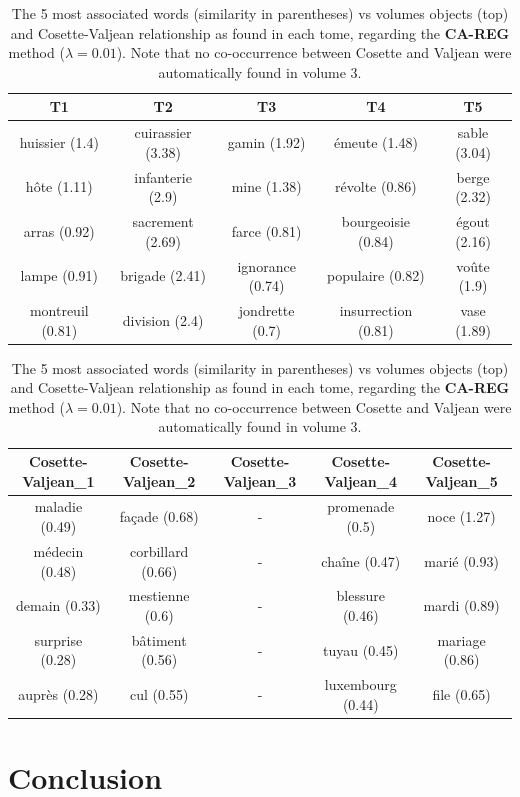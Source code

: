 \documentclass[
twocolumn,
]{ceurart}
\begin{document}
\begin{table}[!bh]
	\centering
	\begin{tabular}{|c|c|c|c|c|}
		\hline
		T1 & T2 & T3 & T4 & T5 \\ \hline
		huissier (1.4) & cuirassier (3.38) & gamin (1.92) & émeute (1.48) & sable (3.04) \\ \hline
		hôte (1.11) & infanterie (2.9) & mine (1.38) & révolte (0.86) & berge (2.32) \\ \hline
		arras (0.92) & sacrement (2.69) & farce (0.81) & bourgeoisie (0.84) & égout (2.16) \\ \hline
		lampe (0.91) & brigade (2.41) & ignorance (0.74) & populaire (0.82) & voûte (1.9) \\ \hline
		montreuil (0.81) & division (2.4) & jondrette (0.7) & insurrection (0.81) & vase (1.89) \\ 
		\hline
	\end{tabular}
	
	\begin{tabular}{|c|c|c|c|c|}
		\hline
		Cosette-Valjean\_1 & Cosette-Valjean\_2 & Cosette-Valjean\_3 & Cosette-Valjean\_4 & Cosette-Valjean\_5 \\ \hline
		maladie (0.49) & façade (0.68) & - & promenade (0.5) & noce (1.27) \\ \hline
		médecin (0.48) & corbillard (0.66) & - &chaîne (0.47) & marié (0.93) \\ \hline
		demain (0.33) & mestienne (0.6) & - & blessure (0.46) & mardi (0.89) \\ \hline
		surprise (0.28) & bâtiment (0.56) & - &tuyau (0.45) & mariage (0.86) \\ \hline
		auprès (0.28) & cul (0.55) & - &luxembourg (0.44) & file (0.65) \\ \hline
	\end{tabular}
	
	\label{CA_TIME_REG_word_vs_obj}
	\caption{The 5 most associated words (similarity in parentheses) vs volumes objects (top) and Cosette-Valjean relationship as found in each tome, regarding the \textbf{CA-REG} method ($\lambda = 0.01$). Note that no co-occurrence between Cosette and Valjean were automatically found in volume 3.}
\end{table}


\section{Conclusion}

\appendix
\end{document}
